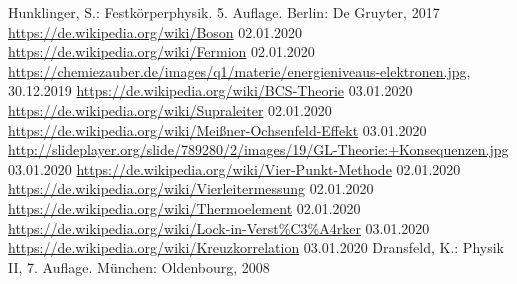 \begin{thebibliography}{xxx}
		Hunklinger, S.: Festkörperphysik. 5. Auflage. Berlin: De Gruyter, 2017
		\url{https://de.wikipedia.org/wiki/Boson}
		02.01.2020
		\url{https://de.wikipedia.org/wiki/Fermion}
		02.01.2020
        \url{https://chemiezauber.de/images/q1/materie/energieniveaus-elektronen.jpg},
		30.12.2019
		\url{https://de.wikipedia.org/wiki/BCS-Theorie}
		03.01.2020
		\url{https://de.wikipedia.org/wiki/Supraleiter}
		02.01.2020
		\url{https://de.wikipedia.org/wiki/Meißner-Ochsenfeld-Effekt}
		03.01.2020
		\url{http://slideplayer.org/slide/789280/2/images/19/GL-Theorie:+Konsequenzen.jpg}
		03.01.2020
		\url{https://de.wikipedia.org/wiki/Vier-Punkt-Methode}
		02.01.2020
		\url{https://de.wikipedia.org/wiki/Vierleitermessung}
		02.01.2020
		\url{https://de.wikipedia.org/wiki/Thermoelement}
		02.01.2020
		\url{https://de.wikipedia.org/wiki/Lock-in-Verst%C3%A4rker}
		03.01.2020
		\url{https://de.wikipedia.org/wiki/Kreuzkorrelation}
		03.01.2020
		Dransfeld, K.: Physik II, 7. Auflage. München: Oldenbourg, 2008

\end{thebibliography}
 
